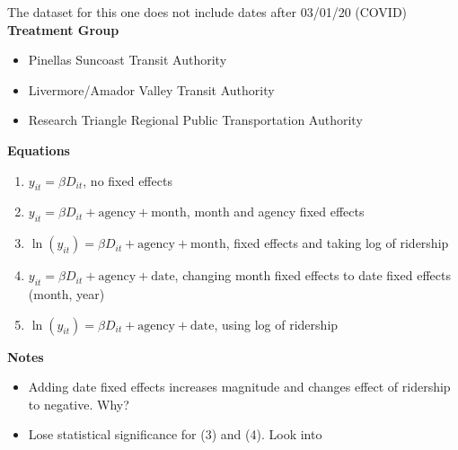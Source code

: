 \documentclass [11pt]{article}
\begin{document}
The dataset for this one does not include dates after 03/01/20 (COVID)\\
\textbf{Treatment Group}
\begin{itemize}
    \item Pinellas Suncoast Transit Authority
    \item Livermore/Amador Valley Transit Authority
    \item Research Triangle Regional Public Transportation Authority
\end{itemize}
\textbf{Equations}
\begin{enumerate}
    \item $y_{it} = \beta D_{it}$, no fixed effects
    \item $y_{it} = \beta D_{it} + \text{agency} + \text{month}$, month and agency fixed effects
    \item $\ln(y_{it}) = \beta D_{it}+ \text{agency} + \text{month}$, fixed effects and taking log of ridership
    \item $y_{it} = \beta D_{it}+ \text{agency} + \text{date}$, changing month fixed effects to date fixed effects (month, year)
    \item $\ln(y_{it}) = \beta D_{it}+ \text{agency} + \text{date}$, using log of ridership
\end{enumerate}
\textbf{Notes}
\begin{itemize}
    \item Adding date fixed effects increases magnitude and changes effect of ridership to negative. Why?
    \item Lose statistical significance for (3) and (4). Look into
\end{itemize}
\end{document}
